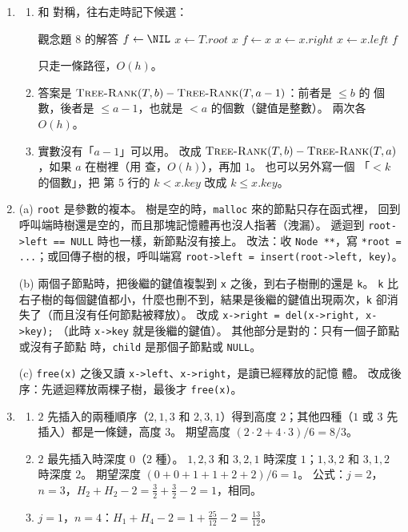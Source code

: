 \begin{enumerate}
\item
\begin{enumerate}
\item 和  對稱，往右走時記下候選：
\begin{pseudo}[unbreakable]{觀念題 8 的解答}
    \State $f \gets \NIL$
    \State $x \gets T.\mathit{root}$
            \State \Return $x$
            \State $f \gets x$ 
            \State $x \gets x.\mathit{right}$
        \Else
            \State $x \gets x.\mathit{left}$
        \EndIf
    \EndWhile
    \State \Return $f$
\EndFunction
\end{pseudo}
只走一條路徑，$O(h)$。
\item 答案是 $\proc{Tree-Rank}(T, b) - \proc{Tree-Rank}(T, a - 1)$：前者是 $\le b$ 的
個數，後者是 $\le a - 1$，也就是 $< a$ 的個數（鍵值是整數）。 兩次各 $O(h)$。
\item 實數沒有「$a - 1$」可以用。 改成 $\proc{Tree-Rank}(T, b) - \proc{Tree-Rank}(T,
a)$，如果 $a$ 在樹裡（用  查，$O(h)$），再加 $1$。 也可以另外寫一個
「$< k$ 的個數」，把  第 5 行的 $k < x.\mathit{key}$ 改成 $k \le
x.\mathit{key}$。
\end{enumerate}

\item
(a) \texttt{root} 是參數的複本。 樹是空的時，\texttt{malloc} 來的節點只存在函式裡，
回到呼叫端時樹還是空的，而且那塊記憶體再也沒人指著（洩漏）。 遞迴到
\texttt{root->left == NULL} 時也一樣，新節點沒有接上。 改法：收 \texttt{Node **}，寫
\texttt{*root = ...}；或回傳子樹的根，呼叫端寫 \texttt{root->left = insert(root->left,
key)}。

(b) 兩個子節點時，把後繼的鍵值複製到 \texttt{x} 之後，到右子樹刪的還是 \texttt{k}。
\texttt{k} 比右子樹的每個鍵值都小，什麼也刪不到，結果是後繼的鍵值出現兩次，\texttt{k}
卻消失了（而且沒有任何節點被釋放）。 改成 \texttt{x->right = del(x->right, x->key);}
（此時 \texttt{x->key} 就是後繼的鍵值）。 其他部分是對的：只有一個子節點或沒有子節點
時，\texttt{child} 是那個子節點或 \texttt{NULL}。

(c) \texttt{free(x)} 之後又讀 \texttt{x->left}、\texttt{x->right}，是讀已經釋放的記憶
體。 改成後序：先遞迴釋放兩棵子樹，最後才 \texttt{free(x)}。

\item
\begin{enumerate}
\item $2$ 先插入的兩種順序（$2, 1, 3$ 和 $2, 3, 1$）得到高度 $2$；其他四種（$1$ 或 $3$
先插入）都是一條鏈，高度 $3$。 期望高度 $(2 \cdot 2 + 4 \cdot 3)/6 = 8/3$。
\item $2$ 最先插入時深度 $0$（$2$ 種）。 $1, 2, 3$ 和 $3, 2, 1$ 時深度 $1$；$1, 3, 2$
和 $3, 1, 2$ 時深度 $2$。 期望深度 $(0 + 0 + 1 + 1 + 2 + 2)/6 = 1$。 公式：$j = 2$，
$n = 3$，$H_2 + H_2 - 2 = \frac32 + \frac32 - 2 = 1$，相同。
\item $j = 1$，$n = 4$：$H_1 + H_4 - 2 = 1 + \frac{25}{12} - 2 = \frac{13}{12}$。
\end{enumerate}

\end{enumerate}

